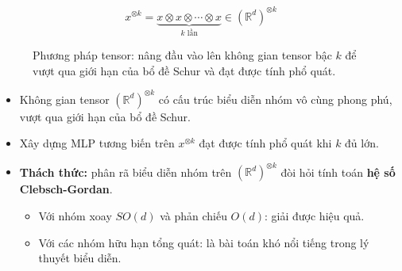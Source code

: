 \begin{equation}
    x^{\otimes k} = \underbrace{x \otimes x \otimes \cdots \otimes x}_{k \text{ lần}} \in (\mathbb{R}^d)^{\otimes k}
    \label{eq:tensor-power}
\end{equation}

\begin{figure}[H]
\centering
{}
\caption{Phương pháp tensor: nâng đầu vào lên không gian tensor bậc $k$ để vượt qua giới hạn của bổ đề Schur và đạt được tính phổ quát.}
\label{fig:tensor-method}
\end{figure}

\begin{itemize}
    \item Không gian tensor $(\mathbb{R}^d)^{\otimes k}$ có cấu trúc biểu diễn nhóm vô cùng phong phú, vượt qua giới hạn của bổ đề Schur.
    \item Xây dựng MLP tương biến trên $x^{\otimes k}$ đạt được tính phổ quát khi $k$ đủ lớn.
    \item \textbf{Thách thức:} phân rã biểu diễn nhóm trên $(\mathbb{R}^d)^{\otimes k}$ đòi hỏi tính toán \textbf{hệ số Clebsch-Gordan}.
        \begin{itemize}
            \item Với nhóm xoay $SO(d)$ và phản chiếu $O(d)$: giải được hiệu quả.
            \item Với các nhóm hữu hạn tổng quát: là bài toán khó nổi tiếng trong lý thuyết biểu diễn.
        \end{itemize}
\end{itemize}

